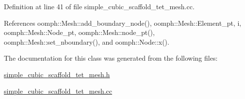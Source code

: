 Definition at line 41 of file simple\+\_\+cubic\+\_\+scaffold\+\_\+tet\+\_\+mesh.\+cc.



References oomph\+::\+Mesh\+::add\+\_\+boundary\+\_\+node(), oomph\+::\+Mesh\+::\+Element\+\_\+pt, i, oomph\+::\+Mesh\+::\+Node\+\_\+pt, oomph\+::\+Mesh\+::node\+\_\+pt(), oomph\+::\+Mesh\+::set\+\_\+nboundary(), and oomph\+::\+Node\+::x().



The documentation for this class was generated from the following files\+:\begin{DoxyCompactItemize}
\item 
\hyperlink{simple__cubic__scaffold__tet__mesh_8h}{simple\+\_\+cubic\+\_\+scaffold\+\_\+tet\+\_\+mesh.\+h}\item 
\hyperlink{simple__cubic__scaffold__tet__mesh_8cc}{simple\+\_\+cubic\+\_\+scaffold\+\_\+tet\+\_\+mesh.\+cc}\end{DoxyCompactItemize}
